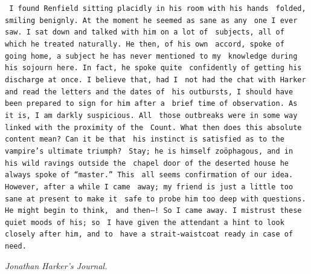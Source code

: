 \documentclass[12pt,openright]{book}
\begin{document}
\texttt{ I found Renfield sitting placidly in his room with his hands}
\texttt{ folded, smiling benignly. At the moment he seemed as sane as any}
\texttt{ one I ever saw. I sat down and talked with him on a lot of}
\texttt{ subjects, all of which he treated naturally. He then, of his own}
\texttt{ accord, spoke of going home, a subject he has never mentioned to my}
\texttt{ knowledge during his sojourn here. In fact, he spoke quite}
\texttt{ confidently of getting his discharge at once. I believe that, had I}
\texttt{ not had the chat with Harker and read the letters and the dates of}
\texttt{ his outbursts, I should have been prepared to sign for him after a}
\texttt{ brief time of observation. As it is, I am darkly suspicious. All}
\texttt{ those outbreaks were in some way linked with the proximity of the}
\texttt{ Count. What then does this absolute content mean? Can it be that}
\texttt{ his instinct is satisfied as to the vampire’s ultimate triumph?}
\texttt{ Stay; he is himself zoöphagous, and in his wild ravings outside the}
\texttt{ chapel door of the deserted house he always spoke of “master.” This}
\texttt{ all seems confirmation of our idea. However, after a while I came}
\texttt{ away; my friend is just a little too sane at present to make it}
\texttt{ safe to probe him too deep with questions. He might begin to think,}
\texttt{ and then--! So I came away. I mistrust these quiet moods of his; so}
\texttt{ I have given the attendant a hint to look closely after him, and to}
\texttt{ have a strait-waistcoat ready in case of need.}

\textit{Jonathan Harker’s Journal.}
\end{document}
